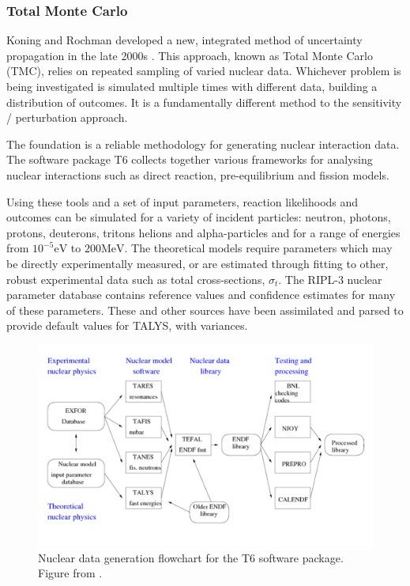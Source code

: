\FloatBarrier
\subsubsection{Total Monte Carlo}
\label{subsubsec:tmc}
Koning and Rochman developed a new, integrated method of uncertainty propagation in the late 2000s \cite{Koning2008}. This approach, known as Total Monte Carlo (TMC), relies on repeated sampling of varied nuclear data. Whichever problem is being investigated is simulated multiple times with different data, building a distribution of outcomes. It is a fundamentally different method to the sensitivity / perturbation approach. 

The foundation is a reliable methodology for generating nuclear interaction data. The software package T6 \cite{Koning2005} collects together various frameworks for analysing nuclear interactions such as direct reaction, pre-equilibrium and fission models. 

Using these tools and a set of input parameters, reaction likelihoods and outcomes can be simulated for a variety of incident particles: neutron, photons, protons, deuterons, tritons helions and alpha-particles and for a range of energies from $10^{-5}\mathrm{eV}$ to $200\mathrm{MeV}$. The theoretical models require parameters which may be directly experimentally measured, or are estimated through fitting to other, robust experimental data such as total cross-sections, $\sigma_{t}$. The RIPL-3 nuclear parameter database \cite{Capote2009} contains reference values and confidence estimates for many of these parameters. These and other sources have been assimilated and parsed to provide default values for TALYS, with variances. 

\begin{figure}
  \centering
  \includegraphics[width=\textwidth]{t6_flow.png}
  \caption[Nuclear data generation in T6 package.]{Nuclear data generation flowchart for the T6 software package. Figure from \cite{Koning2013}.}
  \label{fig:t6_overview}
\end{figure}

